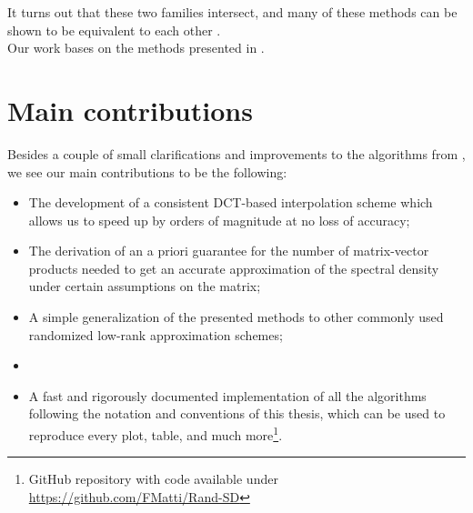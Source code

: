 
It turns out that these two families intersect, and many of these methods
can be shown to be equivalent to each other \cite{chen2023kpm}.\\

Our work bases on the methods presented in \cite{lin2017randomized}.



\section{Main contributions}
\label{sec:1-introduction-contributions}

Besides a couple of small clarifications and improvements to the algorithms 
from \cite{lin2017randomized}, we see our main contributions to be the following:%

\begin{itemize}
    \item The development of a consistent \gls{DCT}-based interpolation scheme which allows us
          to speed up \cite[Algorithm~5]{lin2017randomized} by orders of magnitude
          at no loss of accuracy;
    \item The derivation of an a priori guarantee for the number of matrix-vector
          products needed to get an accurate approximation of the spectral
          density under certain assumptions on the matrix;
    \item A simple generalization of the presented methods to other
          commonly used randomized low-rank approximation schemes;
    \item {}
    \item A fast and rigorously documented implementation of all the algorithms
          following the notation and conventions of this thesis, which can be used to
          reproduce every plot, table, and much more\footnote{GitHub repository with
          code available under \url{https://github.com/FMatti/Rand-SD}}.
\end{itemize}


